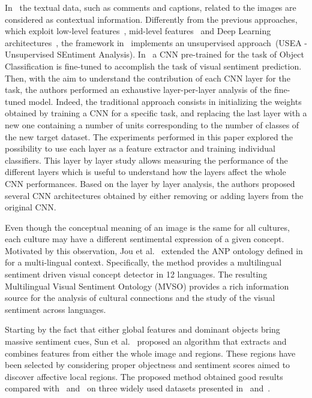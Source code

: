 In~\cite{wang2015unsupervised} the textual data, such as comments and captions, related to the images are considered as contextual information. Differently from the previous approaches, which exploit low-level features~\cite{jia2012can}, mid-level features~\cite{borth2013large, yuan2013sentribute} and Deep Learning architectures~\cite{you2015robust, peng2015mixed}, the framework in~\cite{wang2015unsupervised} implements an unsupervised approach~(USEA - Unsupervised SEntiment Analysis).
In~\cite{campos2015diving} a CNN pre-trained for the task of Object Classification is fine-tuned to accomplish the task of visual sentiment prediction. Then, with the aim to understand the contribution of each CNN layer for the task, the authors performed an exhaustive layer-per-layer analysis of the fine-tuned model. Indeed, the traditional approach consists in initializing the weights obtained by training a CNN for a specific task, and replacing the last layer with a new one containing a number of units corresponding to the number of classes of the new target dataset.
The experiments performed in this paper explored the possibility to use each layer as a feature extractor and training individual classifiers. This layer by layer study allows measuring the performance of the different layers which is useful to understand how the layers affect the whole CNN performances. Based on the layer by layer analysis, the authors proposed several CNN architectures obtained by either removing or adding layers from the original CNN.

Even though the conceptual meaning of an image is the same for all cultures, each culture may have a different sentimental expression of a given concept. %
Motivated by this observation, Jou et al.~\cite{jou2015visual} extended the ANP ontology defined in~\cite{borth2013large} for a multi-lingual context. Specifically, the method provides a multilingual sentiment driven visual concept detector in 12 languages. The resulting Multilingual Visual Sentiment Ontology (MVSO) provides a rich information source for the analysis of cultural connections and the study of the visual sentiment across languages.

Starting by the fact that either global features and dominant objects bring massive sentiment cues, Sun et al.~\cite{sun2016discovering} proposed an algorithm that extracts and combines features from either the whole image and  regions. These regions have been selected by considering proper objectness and sentiment scores  aimed to discover affective local regions.
The proposed method obtained good results compared with~\cite{borth2013large} and~\cite{you2015robust} on three widely used datasets presented in~\cite{borth2013large} and~\cite{you2015robust}.

